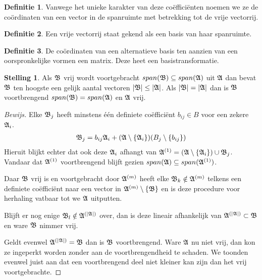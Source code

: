 \documentclass{amsart}
\theoremstyle{definition}
\newtheorem{thm}{Stelling}[section]
\newtheorem{dfn}{Definitie}[section]
\newenvironment{bewijs}{\begin{proof}[Bewijs]}{\end{proof}}
\newcommand{\setsm}[1]{\{{#1}\}}
\newcommand{\without}[1]{\setminus\setsm{#1}}
\newcommand{\abs}[1]{\lvert{#1}\rvert}
\newcommand{\vecrow}[1][a]{\mathfrak{\MakeUppercase{#1}}}
\newcommand{\rvec}[2][i]{{#2}_{#1}}
\newcommand{\rvecr}[2][i]{\rvec[#1]{\vecrow[#2]}}
\begin{document}
\begin{dfn}
	Vanwege het unieke karakter van deze coëfficiënten noemen we ze de coördinaten van een vector in de spanruimte met betrekking tot de vrije vectorrij.
\end{dfn}

\begin{dfn}
	Een vrije vectorrij staat gekend als een basis van haar spanruimte.
\end{dfn}

\begin{dfn}
	De coördinaten van een alternatieve basis ten aanzien van een oorspronkelijke vormen een matrix.
	Deze heet een basistransformatie.
\end{dfn}

\begin{thm}
	Als $\vecrow[b]$ vrij wordt voortgebracht $span(\vecrow[b]) \subseteq span(\vecrow)$ uit $\vecrow$ dan bevat $\vecrow[b]$ ten hoogste een gelijk aantal vectoren $\abs{\vecrow[b]} \leq \abs\vecrow$.
	Als $\abs{\vecrow[b]} = \abs\vecrow$ dan is $\vecrow[b]$ voortbrengend $span(\vecrow[b]) = span(\vecrow)$ en $\vecrow$ vrij.
	\begin{bewijs}
		Elke $\vecrow[b]_j$ heeft minstens één definiete coëfficiënt $b_{ij} \in B$ voor een zekere $\vecrow_i$.
		\begin{align*}
			\vecrow[b]_j = b_{ij}\vecrow_i + (\vecrow \without{\vecrow_i})(B_j  \without{b_{ij}})
		\end{align*}
		Hieruit blijkt echter dat ook deze $\vecrow_i$ afhangt van  $\vecrow^{(1)} = \left(\vecrow \without{\vecrow_i}\right) \cup \rvecr[j]{b}$.
		Vandaar dat $\vecrow^{(1)}$ voortbrengend blijft gezien $span(\vecrow) \subseteq span(\vecrow^{(1)})$.

		Daar $\vecrow[b]$ vrij is en voortgebracht door $\vecrow^{(m)}$ heeft elke $\rvecr[k]{b} \notin \vecrow^{(m)}$ telkens een definiete coëfficiënt naar een vector in $\vecrow^{(m)}\without{\vecrow[b]}$
		en is deze procedure voor herhaling vatbaar tot we $\vecrow$ uitputten.

		Blijft er nog enige $\vecrow[b]_l \notin \vecrow^{(\abs{\vecrow})}$ over,
		dan is deze lineair afhankelijk van $\vecrow^{(\abs\vecrow)} \subset \vecrow[b]$ en ware $\vecrow[b]$ nimmer vrij.

		Geldt evenwel $\vecrow^{(\abs{\vecrow})} = \vecrow[b]$ dan is $\vecrow[b]$ voortbrengend.
		Ware $\vecrow$ nu niet vrij, dan kon ze ingeperkt worden zonder aan de voortbrengendheid te schaden.
		We toonden evenwel juist aan dat een voortbrengend deel niet kleiner kan zijn dan het vrij voortgebrachte.
	\end{bewijs}
\end{thm}
\end{document}
